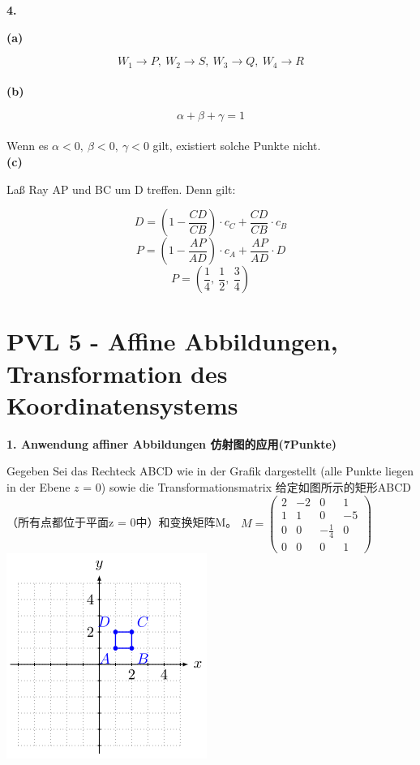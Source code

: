 \documentclass[fleqn]{article}
\begin{document}
\indent\textbf{4.}

\indent\indent\textbf{(a)}

$$W_1 \rightarrow P,\ W_2 \rightarrow S,\ W_3 \rightarrow Q,\ W_4 \rightarrow R$$
\\
\indent\indent\textbf{(b)}

$$\alpha + \beta + \gamma = 1$$\\
\indent\indent Wenn es $\alpha<0,\ \beta<0,\ \gamma<0$ gilt, existiert solche Punkte nicht.
\\

\indent\indent\textbf{(c)}

\indent\indent Laß Ray AP und BC um D treffen.
\indent\indent Denn gilt:

$$D = (1 - \frac{CD}{CB})\cdot c_C + \frac{CD}{CB}\cdot c_B$$
$$P = (1-\frac{AP}{AD})\cdot c_A + \frac{AP}{AD}\cdot D$$
$$P = (\frac{1}{4},\ \frac{1}{2},\ \frac{3}{4})$$

\newpage

\section{PVL 5 - Affine Abbildungen, Transformation des Koordinatensystems}

\noindent\textbf{1. Anwendung affiner Abbildungen 仿射图的应用(7Punkte)}

Gegeben Sei das Rechteck ABCD wie in der Grafik dargestellt (alle Punkte liegen in der Ebene $z$ = 0) sowie die Transformationsmatrix
给定如图所示的矩形ABCD（所有点都位于平面z = 0中）和变换矩阵M。
$M=\begin{pmatrix}
    2&-2&0&1\\
    1&1&0&-5\\
    0&0&-\frac{1}{4}&0\\
    0&0&0&1
\end{pmatrix}$
\includegraphics[scale=0.4]{18.png}
\end{document}
